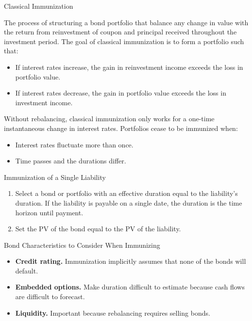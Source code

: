 \documentclass[../custom]{flashcards}
\begin{document}
\begin{flashcard}{Classical Immunization}
    \begin{flushleft}
        The process of structuring a bond portfolio that balance any change in value with the return from reinvestment of coupon and principal received throughout the investment period. The goal of classical immunization is to form a portfolio such that:
        \begin{itemize}
            \item If interest rates increase, the gain in reinvestment income exceeds the loss in portfolio value.
            \item If interest rates decrease, the gain in portfolio value exceeds the loss in investment income.
        \end{itemize}
        Without rebalancing, classical immunization only works for a one-time instantaneous change in interest rates. Portfolios cease to be immunized when:
        \begin{itemize}
            \item Interest rates fluctuate more than once.
            \item Time passes and the durations differ.
        \end{itemize}
    \end{flushleft}
\end{flashcard}

\begin{flashcard}{Immunization of a Single Liability}
    \begin{enumerate}
        \item Select a bond or portfolio with an effective duration equal to the liability's duration. If the liability is payable on a single date, the duration is the time horizon until payment.
        \item Set the PV of the bond equal to the PV of the liability.
    \end{enumerate}
\end{flashcard}

\begin{flashcard}{Bond Characteristics to Consider When Immunizing}
    \begin{itemize}
        \item \textbf{Credit rating.} Immunization implicitly assumes that none of the bonds will default.
        \item \textbf{Embedded options.} Make duration difficult to estimate because cash flows are difficult to forecast.
        \item \textbf{Liquidity.} Important because rebalancing requires selling bonds.
    \end{itemize}
\end{flashcard}
\end{document}

